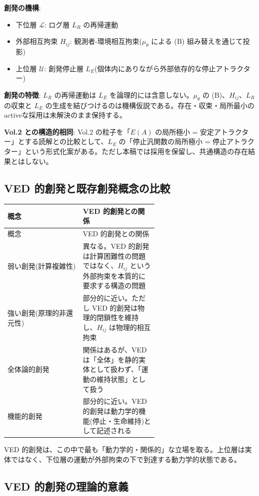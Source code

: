 \textbf{創発の機構}:
\begin{itemize}
\item 下位層 $\mathcal{L}$: ログ層 $L_R$ の再帰運動
\item 外部相互拘束 $H_{ij}$: 観測者-環境相互拘束($\mu_\theta$ による (B) 組み替えを通じて投影)
\item 上位層 $\mathcal{U}$: 創発停止層 $L_E$(個体内にありながら外部依存的な停止アトラクター)
\end{itemize}


\textbf{創発の特徴}:
$L_R$ の再帰運動は $L_E$ を論理的には含意しない。$\mu_\theta$ の (B)、$H_{ij}$、$L_R$ の収束と $L_E$ の生成を結びつけるのは機構仮説である。存在・収束・局所最小のactiveな採用は未解決のまま保持する。

\textbf{Vol.2 との構造的相同}:
Vol.2 の粒子を「$E(A)$ の局所極小 = 安定アトラクター」とする読解との比較として、$L_E$ の「停止汎関数の局所極小 = 停止アトラクター」という形式化案がある。ただし本稿では採用を保留し、共通構造の存在結果とはしない。

\bigskip


\subsection{VED 的創発と既存創発概念の比較}


\begin{longtable}{@{}p{0.30\linewidth}p{0.30\linewidth}@{}}
\toprule
概念 & VED 的創発との関係 \\
\midrule
\endfirsthead
\toprule
概念 & VED 的創発との関係 \\
\midrule
\endhead
弱い創発(計算複雑性) & 異なる。VED 的創発は計算困難性の問題ではなく、$H_{ij}$ という外部拘束を本質的に要求する構造の問題 \\
強い創発(原理的非還元性) & 部分的に近い。ただし VED 的創発は物理的閉鎖性を維持し、$H_{ij}$ は物理的相互拘束 \\
全体論的創発 & 関係はあるが、VED は「全体」を静的実体として扱わず、「運動の維持状態」として扱う \\
機能的創発 & 部分的に近い。VED 的創発は動力学的機能(停止・生命維持)として記述される \\
\bottomrule
\end{longtable}


VED 的創発は、この中で最も「動力学的・関係的」な立場を取る。上位層は実体ではなく、下位層の運動が外部拘束の下で到達する動力学的状態である。

\bigskip


\subsection{VED 的創発の理論的意義}


